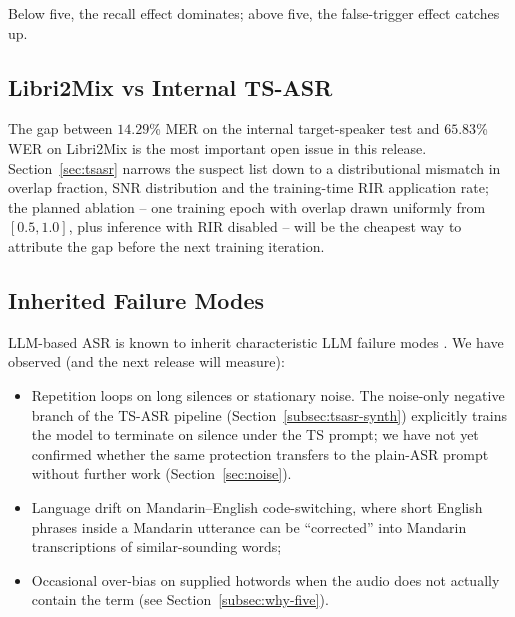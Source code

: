 Below five, the recall effect dominates; above five, the false-trigger
effect catches up.

\subsection{Libri2Mix vs Internal TS-ASR}

The gap between $14.29$\% MER on the internal target-speaker test and
$65.83$\% WER on Libri2Mix is the most important open issue in this
release. Section~\ref{sec:tsasr} narrows the suspect list down to a
distributional mismatch in overlap fraction, SNR distribution and the
training-time RIR application rate; the planned ablation -- one
training epoch with overlap drawn uniformly from $[0.5, 1.0]$, plus
inference with RIR disabled -- will be the cheapest way to attribute
the gap before the next training iteration.

\subsection{Inherited Failure Modes}

LLM-based ASR is known to inherit characteristic LLM failure modes
\cite{radford2023whisper, chu2023qwenaudio}. We have observed (and the
next release will measure):

\begin{itemize}
  \item Repetition loops on long silences or stationary noise. The
        noise-only negative branch of the TS-ASR pipeline
        (Section~\ref{subsec:tsasr-synth}) explicitly trains the model
        to terminate on silence under the TS prompt; we have not yet
        confirmed whether the same protection transfers to the
        plain-ASR prompt without further work
        (Section~\ref{sec:noise}).
  \item Language drift on Mandarin--English code-switching, where short
        English phrases inside a Mandarin utterance can be ``corrected''
        into Mandarin transcriptions of similar-sounding words;
  \item Occasional over-bias on supplied hotwords when the audio does
        not actually contain the term (see
        Section~\ref{subsec:why-five}).
\end{itemize}
